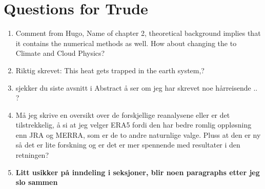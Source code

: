 \section{Questions for Trude}
\begin{enumerate}
    \item Comment from Hugo, Name of chapter 2, theoretical background implies that it contains the numerical methods as well. How about changing the to Climate and Cloud Physics?
    \item Riktig skrevet: This heat gets trapped in the earth system,?
    \item sjekker du siste avsnitt i Abstract å ser om jeg har skrevet noe hårreisende .. ?
    \item Må jeg skrive en oversikt over de forskjellige reanalysene eller er det tilstrekkelig, å si at jeg velger ERA5 fordi den har bedre romlig oppløsning enn JRA og MERRA, som er de to andre naturnlige valge. Pluss at den er ny så det er lite forskning og er det er mer spennende med resultater i den retningen?
    \item \textbf{Litt usikker på inndeling i seksjoner, blir noen paragraphs etter jeg slo sammen }
\end{enumerate}